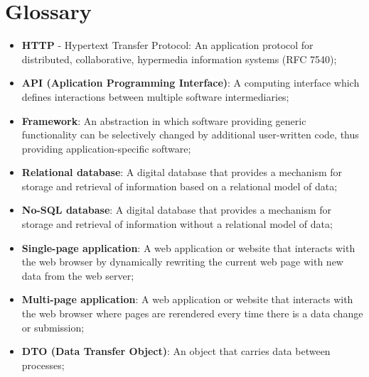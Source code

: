 \chapter*{Glossary}

\begin{itemize}
    \item \textbf{HTTP} - Hypertext Transfer Protocol: An application protocol for distributed,
     collaborative, hypermedia information systems (RFC 7540);
    \item \textbf{API (Aplication Programming Interface)}: A computing interface which defines
     interactions between multiple software intermediaries;
    \item \textbf{Framework}: An abstraction in which software providing generic functionality can
     be selectively changed by additional user-written code,
     thus providing application-specific software;
     \item \textbf{Relational database}: A digital database that provides a mechanism for storage and
     retrieval of information based on a relational model of data;
     \item \textbf{No-SQL database}: A digital database that provides a mechanism for storage and
     retrieval of information without a relational model of data;
     \item \textbf{Single-page application}: A web application or website that interacts with the web browser by dynamically
     rewriting the current web page with new data from the web server;
     \item \textbf{Multi-page application}: A web application or website that interacts with the web browser where pages
     are rerendered every time there is a data change or submission;
     \item \textbf{DTO (Data Transfer Object)}: An object that carries data between processes;
\end{itemize}